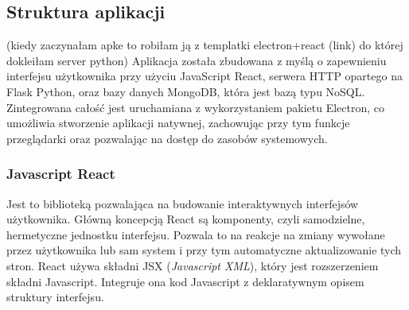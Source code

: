 \documentclass[12pt,a4paper,twoside]{article}
\begin{document}
\subsection{Struktura aplikacji}
(kiedy zaczynałam apke to robiłam ją z templatki electron+react (link) do której dokleiłam server python)
Aplikacja została zbudowana z myślą o zapewnieniu interfejsu użytkownika przy użyciu JavaScript React, serwera HTTP opartego na Flask Python, oraz bazy danych MongoDB, która jest bazą typu NoSQL. Zintegrowana całość jest uruchamiana z wykorzystaniem pakietu Electron, co umożliwia stworzenie aplikacji natywnej, zachowując przy tym funkcje przeglądarki oraz pozwalając na dostęp do zasobów systemowych.
\subsubsection*{Javascript React}
Jest to biblioteką pozwalająca na budowanie interaktywnych interfejsów użytkownika. Główną koncepcją React są komponenty, czyli samodzielne, hermetyczne jednostku interfejsu. Pozwala to na reakcje na zmiany wywołane przez użytkownika lub sam system i przy tym automatyczne aktualizowanie tych stron. React używa składni JSX (\textit{Javascript XML}), który jest rozszerzeniem składni Javascript. Integruje ona kod Javascript z deklaratywnym opisem struktury interfejsu.
\end{document}
